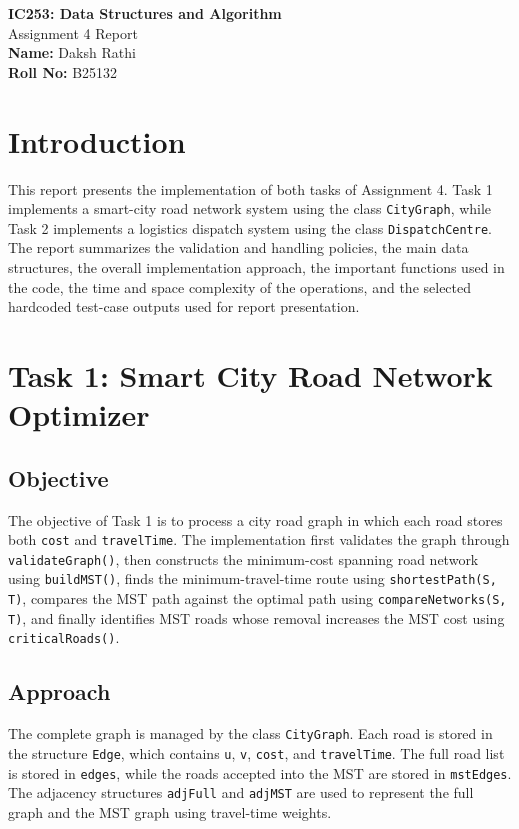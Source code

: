 \documentclass[10pt,a4paper]{article}
\begin{document}
\thispagestyle{empty}

\begin{center}
\vspace*{0.55cm}
{\LARGE \textbf{IC253: Data Structures and Algorithm}}\\[0.35em]
{\Large Assignment 4 Report}\\[0.85em]
{\large \textbf{Name:} Daksh Rathi}\\[0.2em]
{\large \textbf{Roll No:} B25132}
\end{center}

\vspace{1.1cm}

\section{Introduction}
This report presents the implementation of both tasks of Assignment 4. Task 1 implements a smart-city road network system using the class \texttt{CityGraph}, while Task 2 implements a logistics dispatch system using the class \texttt{DispatchCentre}. The report summarizes the validation and handling policies, the main data structures, the overall implementation approach, the important functions used in the code, the time and space complexity of the operations, and the selected hardcoded test-case outputs used for report presentation.

\section{Task 1: Smart City Road Network Optimizer}

\subsection{Objective}
The objective of Task 1 is to process a city road graph in which each road stores both \texttt{cost} and \texttt{travelTime}. The implementation first validates the graph through \texttt{validateGraph()}, then constructs the minimum-cost spanning road network using \texttt{buildMST()}, finds the minimum-travel-time route using \texttt{shortestPath(S, T)}, compares the MST path against the optimal path using \texttt{compareNetworks(S, T)}, and finally identifies MST roads whose removal increases the MST cost using \texttt{criticalRoads()}.

\subsection{Approach}
The complete graph is managed by the class \texttt{CityGraph}. Each road is stored in the structure \texttt{Edge}, which contains \texttt{u}, \texttt{v}, \texttt{cost}, and \texttt{travelTime}. The full road list is stored in \texttt{edges}, while the roads accepted into the MST are stored in \texttt{mstEdges}. The adjacency structures \texttt{adjFull} and \texttt{adjMST} are used to represent the full graph and the MST graph using travel-time weights.
\end{document}
